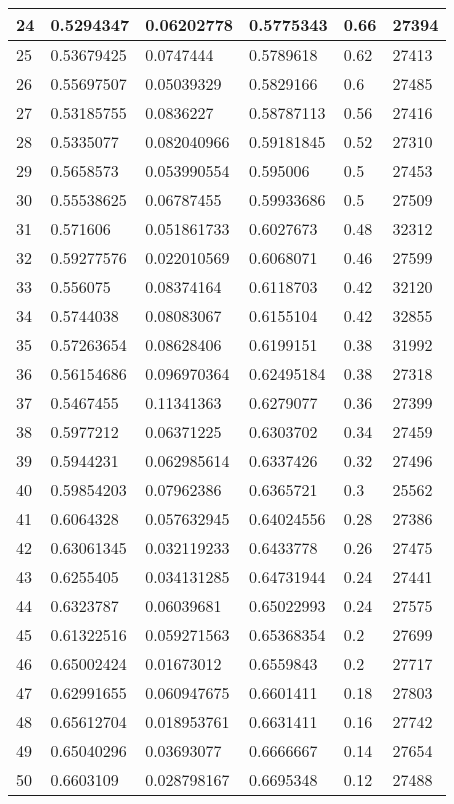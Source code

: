 \begin{longtable}{|l|l|l|l|l|l|}
24 & 0.5294347 & 0.06202778 & 0.5775343 & 0.66 & 27394 \\ \hline 
25 & 0.53679425 & 0.0747444 & 0.5789618 & 0.62 & 27413 \\ \hline 
26 & 0.55697507 & 0.05039329 & 0.5829166 & 0.6 & 27485 \\ \hline 
27 & 0.53185755 & 0.0836227 & 0.58787113 & 0.56 & 27416 \\ \hline 
28 & 0.5335077 & 0.082040966 & 0.59181845 & 0.52 & 27310 \\ \hline 
29 & 0.5658573 & 0.053990554 & 0.595006 & 0.5 & 27453 \\ \hline 
30 & 0.55538625 & 0.06787455 & 0.59933686 & 0.5 & 27509 \\ \hline 
31 & 0.571606 & 0.051861733 & 0.6027673 & 0.48 & 32312 \\ \hline 
32 & 0.59277576 & 0.022010569 & 0.6068071 & 0.46 & 27599 \\ \hline 
33 & 0.556075 & 0.08374164 & 0.6118703 & 0.42 & 32120 \\ \hline 
34 & 0.5744038 & 0.08083067 & 0.6155104 & 0.42 & 32855 \\ \hline 
35 & 0.57263654 & 0.08628406 & 0.6199151 & 0.38 & 31992 \\ \hline 
36 & 0.56154686 & 0.096970364 & 0.62495184 & 0.38 & 27318 \\ \hline 
37 & 0.5467455 & 0.11341363 & 0.6279077 & 0.36 & 27399 \\ \hline 
38 & 0.5977212 & 0.06371225 & 0.6303702 & 0.34 & 27459 \\ \hline 
39 & 0.5944231 & 0.062985614 & 0.6337426 & 0.32 & 27496 \\ \hline 
40 & 0.59854203 & 0.07962386 & 0.6365721 & 0.3 & 25562 \\ \hline 
41 & 0.6064328 & 0.057632945 & 0.64024556 & 0.28 & 27386 \\ \hline 
42 & 0.63061345 & 0.032119233 & 0.6433778 & 0.26 & 27475 \\ \hline 
43 & 0.6255405 & 0.034131285 & 0.64731944 & 0.24 & 27441 \\ \hline 
44 & 0.6323787 & 0.06039681 & 0.65022993 & 0.24 & 27575 \\ \hline 
45 & 0.61322516 & 0.059271563 & 0.65368354 & 0.2 & 27699 \\ \hline 
46 & 0.65002424 & 0.01673012 & 0.6559843 & 0.2 & 27717 \\ \hline 
47 & 0.62991655 & 0.060947675 & 0.6601411 & 0.18 & 27803 \\ \hline 
48 & 0.65612704 & 0.018953761 & 0.6631411 & 0.16 & 27742 \\ \hline 
49 & 0.65040296 & 0.03693077 & 0.6666667 & 0.14 & 27654 \\ \hline 
50 & 0.6603109 & 0.028798167 & 0.6695348 & 0.12 & 27488 \\ \hline 
\end{longtable}